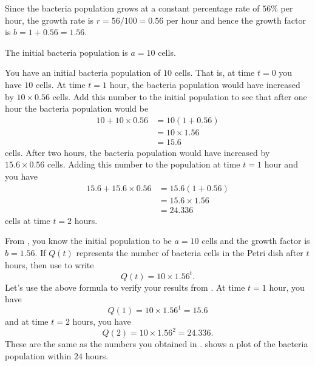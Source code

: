 \documentclass[a4paper,oneside,12pt]{article}
\begin{document}
\begin{solution}
Since the bacteria population grows at a constant percentage rate of
$56\%$ per hour, the growth rate is $r = 56 / 100 = 0.56$ per hour and
hence the growth factor is $b = 1 + 0.56 = 1.56$.

The initial bacteria population is $a = 10$ cells.

You have an initial bacteria population of $10$ cells.  That is, at
time $t = 0$ you have $10$ cells.  At time $t = 1$ hour, the bacteria
population would have increased by $10 \times 0.56$ cells.  Add this
number to the initial population to see that after one hour the
bacteria population would be
\begin{align*}
10 + 10 \times 0.56
&=
10 (1 + 0.56) \\[4pt]
&=
10 \times 1.56 \\[4pt]
&=
15.6
\end{align*}
cells.  After two hours, the bacteria population would have increased
by $15.6 \times 0.56$ cells.  Adding this number to the population at
time $t = 1$ hour and you have
\begin{align*}
15.6 + 15.6 \times 0.56
&=
15.6 (1 + 0.56) \\[4pt]
&=
15.6 \times 1.56 \\[4pt]
&=
24.336
\end{align*}
cells at time $t = 2$ hours.

From ,
you know the initial population to be $a = 10$ cells and the growth
factor is $b = 1.56$.  If $Q(t)$ represents the number of bacteria
cells in the Petri dish after $t$ hours, then use
 to write
\begin{equation}
\label{eqn:exponential:bacterial_growth}
Q(t)
=
10 \times 1.56^t.
\end{equation}
Let's use the above formula to verify your results
from .  At time
$t = 1$ hour, you have
\[
Q(1)
=
10 \times 1.56^1
=
15.6
\]
and at time $t = 2$ hours, you have
\[
Q(2)
=
10 \times 1.56^2
=
24.336.
\]
These are the same as the numbers you obtained
in .
 shows a plot of
the bacteria population within $24$ hours.
\end{solution}
\end{document}
